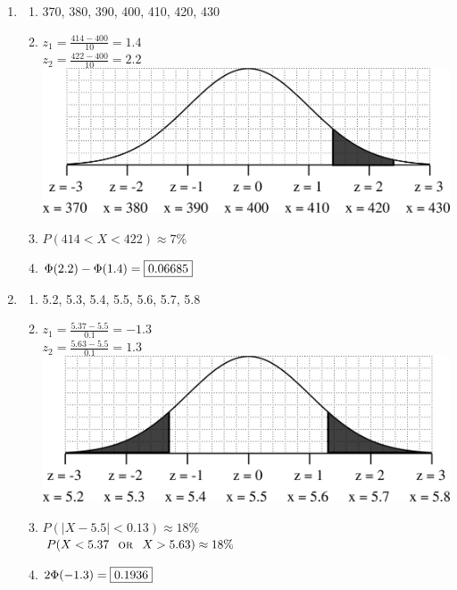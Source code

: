 \documentclass[12pt,letterpaper]{article}
\begin{document}
\newpage
{}
\begin{multicols}{2}
\begin{enumerate}
\item \begin{enumerate} \item 370, 380, 390, 400, 410, 420, 430
\item $z_1 = \frac{414-400}{10} = 1.4$\\
$z_2 = \frac{422-400}{10} = 2.2 $\\
\includegraphics[scale=0.4]{figures/A1.png}
\item $P(414<X<422) \approx 7\%$
\item $\Phi(2.2)-\Phi(1.4) = \fbox{0.06685}$
\end{enumerate}

\item \begin{enumerate} \item 5.2, 5.3, 5.4, 5.5, 5.6, 5.7, 5.8
\item $z_1 = \frac{5.37-5.5}{0.1} = -1.3$\\
$z_2 = \frac{5.63-5.5}{0.1} = 1.3 $\\
\includegraphics[scale=0.4]{figures/A2.png}
\item $P(|X-5.5|<0.13) \approx 18\%$\\
$P(X<5.37 \textsc{~~or~~} X>5.63) \approx 18\%$

\item $2\Phi(-1.3) = \fbox{0.1936}$
\end{enumerate}


\end{enumerate}
\end{multicols}
\end{document}
